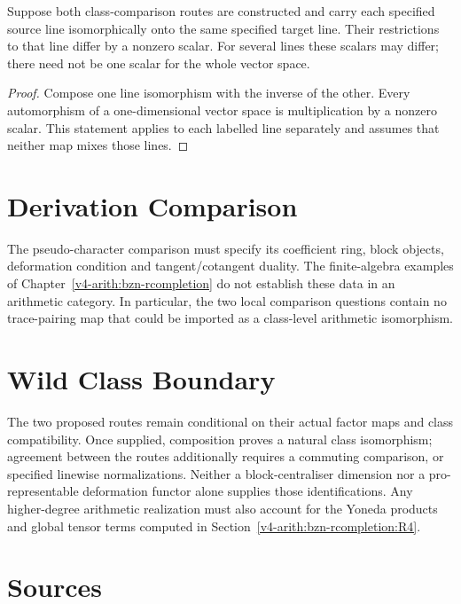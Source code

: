 \begin{corollary}
\label{v4-arith:w10-b:cor:removes-disjoint}
Suppose both class-comparison routes are constructed and carry each
specified source line isomorphically onto the same specified target
line. Their restrictions to that line differ by a nonzero scalar.
For several lines these scalars may differ; there need not be one
scalar for the whole vector space.
\end{corollary}
\begin{proof}
Compose one line isomorphism with the inverse of the other. Every
automorphism of a one-dimensional vector space is multiplication by
a nonzero scalar. This statement applies to each labelled line
separately and assumes that neither map mixes those lines.
\end{proof}

\section{Derivation Comparison}
\label{v4-arith:w10-b:obstruction-analysis}

The pseudo-character comparison must specify its coefficient ring,
block objects, deformation condition and tangent/cotangent duality.
The finite-algebra examples of Chapter~\ref{v4-arith:bzn-rcompletion}
do not establish these data in an arithmetic category. In particular,
the two local comparison questions contain no trace-pairing map
that could be imported as a class-level arithmetic isomorphism.

\section{Wild Class Boundary}
\label{v4-arith:w10-b:summary}

The two proposed routes remain conditional on their actual factor
maps and class compatibility. Once supplied, composition proves a
natural class isomorphism; agreement between the routes additionally
requires a commuting comparison, or specified linewise normalizations.
Neither a block-centraliser dimension nor a pro-representable
deformation functor alone supplies those identifications. Any
higher-degree arithmetic realization must also account for the
Yoneda products and global tensor terms computed in
Section~\ref{v4-arith:bzn-rcompletion:R4}.

\section{Sources}
\label{v4-arith:w10-b:bibliography}

